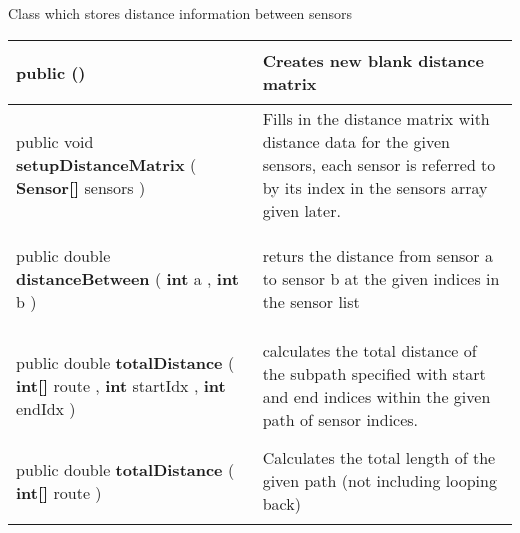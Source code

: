  {\scriptsize Class which stores distance information between sensors
 
\vspace*{-5pt} 
\begin{tabularx}{\linewidth}{X|m{}}
\label{tab:DistanceMatrix}
\begin{raggedleft}public  \textbf{\hyperref[tab:DistanceMatrix]{\color{blue}{DistanceMatrix}}}()
\end{raggedleft} &
 Creates new blank distance matrix\\ \hline 
\begin{raggedleft}public void \textbf{setupDistanceMatrix }(\hspace*{ 5pt} \textbf{Sensor{[}{]}} sensors  )
\end{raggedleft} &
 Fills in the distance matrix with distance data for the given sensors, each sensor is referred to by its index in the sensors array given later.\\ \hline 
\begin{raggedleft}public double \textbf{distanceBetween }(\newline \hfill 
\hspace*{ 5pt} \textbf{int} a , \newline
 \hspace*{ 5pt} \textbf{int} b  )
\end{raggedleft} &
 returs the distance from sensor a to sensor b at the given indices in the sensor list\\ \hline 
\begin{raggedleft}public double \textbf{totalDistance }(\newline \hfill 
\hspace*{ 5pt} \textbf{int{[}{]}} route , \newline
 \hspace*{ 5pt} \textbf{int} startIdx , \newline
 \hspace*{ 5pt} \textbf{int} endIdx  )
\end{raggedleft} &
 calculates the total distance of the subpath specified with start and end indices within the given path of sensor indices.\\ \hline 
\begin{raggedleft}public double \textbf{totalDistance }(\hspace*{ 5pt} \textbf{int{[}{]}} route  )
\end{raggedleft} &
 Calculates the total length of the given path (not including looping back)\\ \hline 

\end{tabularx}}
